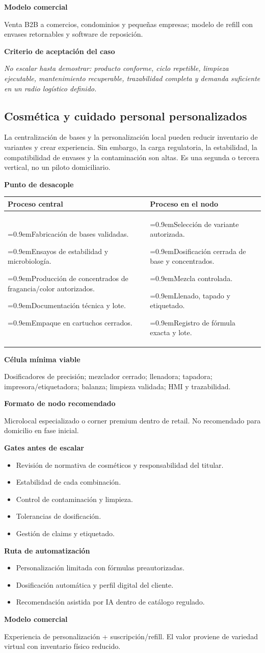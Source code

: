 \documentclass[11pt,a4paper]{article}
\makeatletter
\newcommand{\etiqueta}[1]{\par\medskip\noindent\textbf{#1}\par\nopagebreak\smallskip}
\newcommand{\ti}{\par\hangindent=0.9em\hangafter=1\noindent\makebox[0.9em][l]{\textbullet}}
\newcommand{\desacople}[2]{\etiqueta{Punto de desacople}
  {\small\noindent\begin{tabularx}{\textwidth}{@{}>{\raggedright\arraybackslash}X>{\raggedright\arraybackslash}X@{}}
  \toprule \textbf{Proceso central} & \textbf{Proceso en el nodo}\\ \midrule
  #1 & #2\\ \bottomrule\end{tabularx}}\par}
\newcommand{\rutas}[3]{\etiqueta{Ruta de automatización}
  \begin{itemize}[leftmargin=2.6em,labelwidth=2em]
  \item[\textbf{1.0}] #1
  \item[\textbf{2.0}] #2
  \item[\textbf{3.0}] #3
  \end{itemize}}
\newcommand{\criterio}{\etiqueta{Criterio de aceptación del caso}
  \noindent\textit{No escalar hasta demostrar: producto conforme, ciclo repetible, limpieza ejecutable,
  mantenimiento recuperable, trazabilidad completa y demanda suficiente en un radio logístico definido.}\par}
\makeatother
\begin{document}
\etiqueta{Modelo comercial}
Venta B2B a comercios, condominios y pequeñas empresas; modelo de refill con envases retornables y
software de reposición.

\criterio

\subsection{Cosmética y cuidado personal personalizados}
La centralización de bases y la personalización local pueden reducir inventario de variantes y crear
experiencia. Sin embargo, la carga regulatoria, la estabilidad, la compatibilidad de envases y la
contaminación son altas. Es una segunda o tercera vertical, no un piloto domiciliario.

\desacople{%
\ti Fabricación de bases validadas.
\ti Ensayos de estabilidad y microbiología.
\ti Producción de concentrados de fragancia/color autorizados.
\ti Documentación técnica y lote.
\ti Empaque en cartuchos cerrados.}{%
\ti Selección de variante autorizada.
\ti Dosificación cerrada de base y concentrados.
\ti Mezcla controlada.
\ti Llenado, tapado y etiquetado.
\ti Registro de fórmula exacta y lote.}

\etiqueta{Célula mínima viable}
Dosificadores de precisión; mezclador cerrado; llenadora; tapadora; impresora/etiquetadora; balanza;
limpieza validada; HMI y trazabilidad.

\etiqueta{Formato de nodo recomendado}
Microlocal especializado o corner premium dentro de retail. No recomendado para domicilio en fase
inicial.

\etiqueta{Gates antes de escalar}
\begin{itemize}
\item Revisión de normativa de cosméticos y responsabilidad del titular.
\item Estabilidad de cada combinación.
\item Control de contaminación y limpieza.
\item Tolerancias de dosificación.
\item Gestión de claims y etiquetado.
\end{itemize}

\rutas{Personalización limitada con fórmulas preautorizadas.}
{Dosificación automática y perfil digital del cliente.}
{Recomendación asistida por IA dentro de catálogo regulado.}

\etiqueta{Modelo comercial}
Experiencia de personalización + suscripción/refill. El valor proviene de variedad virtual con
inventario físico reducido.
\end{document}
